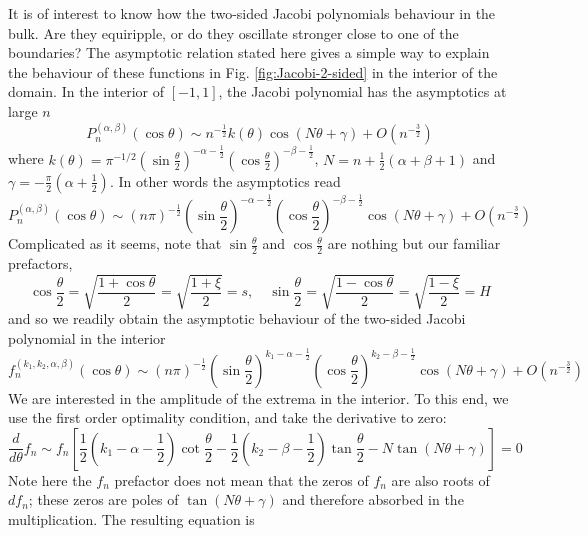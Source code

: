 It is of interest to know how the two-sided Jacobi polynomials behaviour in the bulk. Are they equiripple, or do they oscillate stronger close to one of the boundaries? The asymptotic relation stated here gives a simple way to explain the behaviour of these functions in Fig. \ref{fig:Jacobi-2-sided} in the interior of the domain.
In the interior of $[-1, 1]$, the Jacobi polynomial has the asymptotics at large $n$ \citep{szego_orthogonal_1939}
%
\begin{equation}\label{eqn:asymp-Jacobi-int}
    P_n^{(\alpha, \beta)}(\cos\theta) \sim n^{-\frac{1}{2}} k(\theta) \cos(N\theta + \gamma) + O\left(n^{-\frac{3}{2}}\right)
\end{equation}
where $k(\theta) = \pi^{-1/2} (\sin \frac{\theta}{2})^{-\alpha - \frac{1}{2}} (\cos \frac{\theta}{2})^{-\beta - \frac{1}{2}}$, $N = n + \frac{1}{2}(\alpha + \beta + 1)$ and $\gamma = -\frac{\pi}{2}(\alpha + \frac{1}{2})$. In other words the asymptotics read
%
\[
    P_n^{(\alpha, \beta)}(\cos\theta) \sim (n\pi)^{-\frac{1}{2}} (\sin \frac{\theta}{2})^{-\alpha - \frac{1}{2}} (\cos \frac{\theta}{2})^{-\beta - \frac{1}{2}} \cos\left(N\theta + \gamma\right) + O\left(n^{-\frac{3}{2}}\right)
\]
%
Complicated as it seems, note that $\sin\frac{\theta}{2}$ and $\cos\frac{\theta}{2}$ are nothing but our familiar prefactors,
%
\[
    \cos \frac{\theta}{2} = \sqrt{\frac{1 + \cos\theta}{2}} = \sqrt{\frac{1 + \xi}{2}} = s,\quad 
    \sin \frac{\theta}{2} = \sqrt{\frac{1 - \cos\theta}{2}} = \sqrt{\frac{1 - \xi}{2}} = H
\]
%
and so we readily obtain the asymptotic behaviour of the two-sided Jacobi polynomial in the interior
%
\begin{equation}
    f_n^{(k_1, k_2, \alpha, \beta)}(\cos\theta) \sim (n\pi)^{-\frac{1}{2}} (\sin \frac{\theta}{2})^{k_1 -\alpha - \frac{1}{2}} (\cos \frac{\theta}{2})^{k_2 -\beta - \frac{1}{2}} \cos\left(N\theta + \gamma\right) + O\left(n^{-\frac{3}{2}}\right)
\end{equation}
%
We are interested in the amplitude of the extrema in the interior. To this end, we use the first order optimality condition, and take the derivative to zero:
%
\[
    \frac{d}{d\theta} f_n \sim f_n \left[\frac{1}{2} \left(k_1 - \alpha - \frac{1}{2}\right) \cot\frac{\theta}{2} - \frac{1}{2} \left(k_2 - \beta - \frac{1}{2}\right) \tan \frac{\theta}{2} - N \tan \left(N\theta + \gamma\right)\right] = 0
\]
%
Note here the $f_n$ prefactor does not mean that the zeros of $f_n$ are also roots of $df_n$; these zeros are poles of $\tan(N\theta + \gamma)$ and therefore absorbed in the multiplication. The resulting equation is
